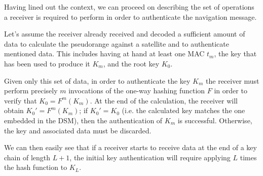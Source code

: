 \par

Having lined out the context, we can proceed on describing the set of operations
a receiver is required to perform in order to authenticate the navigation
message.

Let's assume the receiver already received and decoded a sufficient amount of
data to calculate the pseudorange against a satellite and to authenticate
mentioned data. This includes having at hand at least one MAC $t_m$, the key that
has been used to produce it $K_m$, and the root key $K_0$.

Given only this set of data, in order to authenticate the key $K_m$ the
receiver must perform precisely $m$ invocations of the one-way hashing function
$F$ in order to verify that $K_0 = F^m(K_m)$. At the end of the calculation, the
receiver will obtain $K_0' = F^m(K_m)$; if $K_0' = K_0$ (i.e. the calculated key
matches the one embedded in the DSM), then the authentication of $K_m$ is
successful. Otherwise, the key and associated data must be discarded.

We can then easily see that if a receiver starts to receive data at the end of a
key chain of length $L+1$, the initial key authentication will require applying
$L$ times the hash function to $K_L$.

\par

